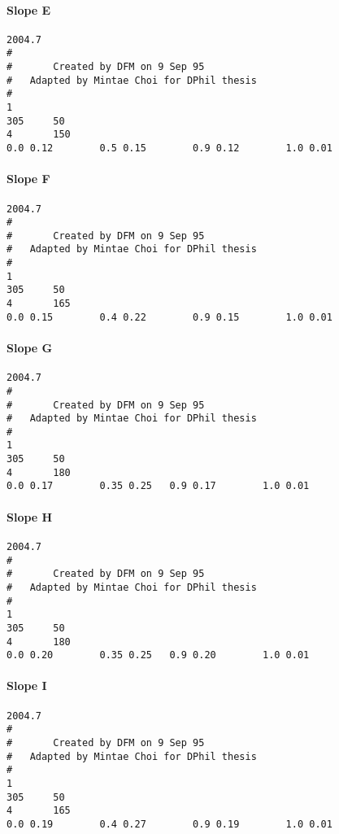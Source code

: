 \paragraph{Slope E}

\scriptsize

\begin{verbatim}
2004.7
#
#       Created by DFM on 9 Sep 95
#   Adapted by Mintae Choi for DPhil thesis
#
1
305     50
4       150
0.0 0.12		0.5 0.15		0.9 0.12		1.0 0.01
\end{verbatim}

\paragraph{Slope F}

\scriptsize

\begin{verbatim}
2004.7
#
#       Created by DFM on 9 Sep 95
#   Adapted by Mintae Choi for DPhil thesis
#
1
305     50
4       165
0.0 0.15		0.4 0.22		0.9 0.15		1.0 0.01
\end{verbatim}

\paragraph{Slope G}

\scriptsize

\begin{verbatim}
2004.7
#
#       Created by DFM on 9 Sep 95
#   Adapted by Mintae Choi for DPhil thesis
#
1
305     50
4       180
0.0 0.17		0.35 0.25	0.9 0.17		1.0 0.01
\end{verbatim}

\paragraph{Slope H}

\scriptsize

\begin{verbatim}
2004.7
#
#       Created by DFM on 9 Sep 95
#   Adapted by Mintae Choi for DPhil thesis
#
1
305     50
4       180
0.0 0.20		0.35 0.25	0.9 0.20		1.0 0.01
\end{verbatim}

\paragraph{Slope I}

\scriptsize

\begin{verbatim}
2004.7
#
#       Created by DFM on 9 Sep 95
#   Adapted by Mintae Choi for DPhil thesis
#
1
305     50
4       165
0.0 0.19		0.4 0.27		0.9 0.19		1.0 0.01
\end{verbatim}

